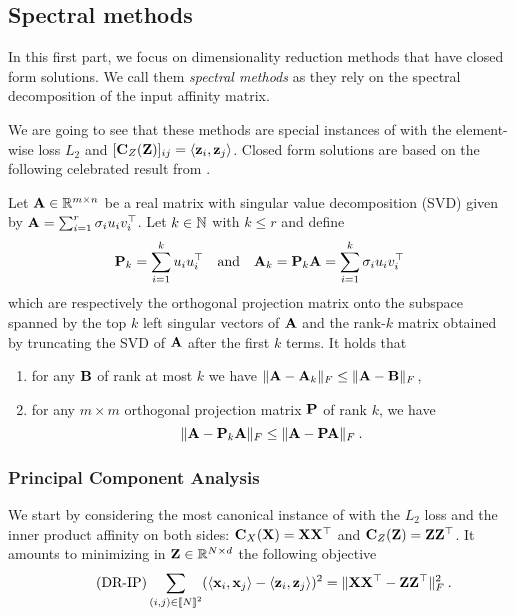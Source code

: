 \subsection{Spectral methods}

In this first part, we focus on dimensionality reduction methods that have closed form solutions. We call them \emph{spectral methods} as they rely on the spectral decomposition of the input affinity matrix.

We are going to see that these methods are special instances of  with the element-wise loss $L_2$ and $[{\mathbf{C}}_Z({\mathbf{Z}})]_{ij} = \langle {\mathbf{z}}_i, {\mathbf{z}}_j \rangle$.
Closed form solutions are based on the following celebrated result from \cite{eckart1936approximation}.

\begin{theorem}{\cite{eckart1936approximation}}\label{thm:eckart}
	Let ${\mathbf{A}} \in \mathbb{R}^{m \times n}$ be a real matrix with singular value decomposition (SVD) given by ${\mathbf{A}} = \sum_{i=1}^{r} \sigma_i u_i v_i^\top$. Let $k \in \mathbb{N}$ with $k \leq r$ and define 
	\begin{align}
		{\mathbf{P}}_k = \sum_{i=1}^{k} u_i u_i^\top \quad \text{and} \quad {\mathbf{A}}_k = {\mathbf{P}}_k {\mathbf{A}} = \sum_{i=1}^{k} \sigma_i u_i v_i^\top
	\end{align}
	which are respectively the orthogonal projection matrix onto the subspace spanned by the top $k$ left singular vectors of ${\mathbf{A}}$ and the rank-$k$ matrix obtained by truncating the SVD of ${\mathbf{A}}$ after the first $k$ terms. It holds that
	\begin{enumerate}[label=(\alph*)]
        \item for any ${\mathbf{B}}$ of rank at most $k$ we have $\| {\mathbf{A}} - {\mathbf{A}}_k \|_F \leq \| {\mathbf{A}} - {\mathbf{B}} \|_F$,
        \item for any $m \times m$ orthogonal projection matrix ${\mathbf{P}}$ of rank $k$, we have $$\| {\mathbf{A}} - {\mathbf{P}}_k {\mathbf{A}} \|_F \leq \| {\mathbf{A}} - {\mathbf{P}} {\mathbf{A}} \|_F \: .$$
    \end{enumerate} 
\end{theorem}

\subsubsection{Principal Component Analysis}

We start by considering the most canonical instance of  with the $L_2$ loss and the inner product affinity on both sides: ${\mathbf{C}}_X({\mathbf{X}}) = {\mathbf{X}} {\mathbf{X}}^\top$ and ${\mathbf{C}}_Z({\mathbf{Z}}) = {\mathbf{Z}} {\mathbf{Z}}^\top$. It amounts to minimizing in ${\mathbf{Z}} \in \mathbb{R}^{N \times d}$ the following objective
\begin{equation*}\label{eq:DR_IP}\tag{DR-IP}
	\sum_{(i,j) \in {[\![N]\!]}^2} (\langle {\mathbf{x}}_i, {\mathbf{x}}_j \rangle - \langle {\mathbf{z}}_i, {\mathbf{z}}_j \rangle)^2 = \| {\mathbf{X}} {\mathbf{X}}^\top - {\mathbf{Z}} {\mathbf{Z}}^\top \|_F^2 \:.
\end{equation*}

